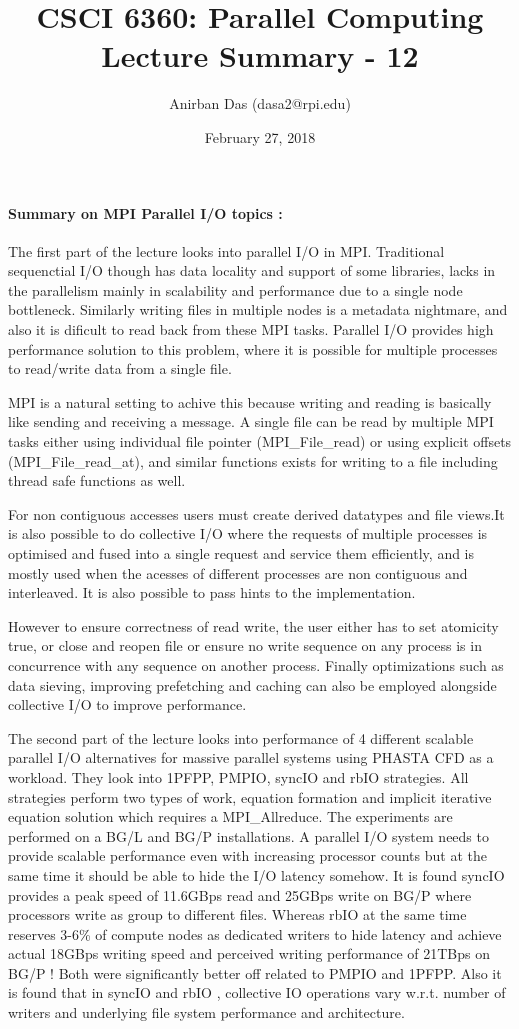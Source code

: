 \documentclass[a4paper,12 pt]{article}
\title{\vspace{-2.0cm}CSCI 6360: Parallel Computing Lecture Summary - 12}
\author{Anirban Das (dasa2@rpi.edu) }
\date{February 27, 2018}
\begin{document}
\maketitle

\paragraph{Summary on MPI Parallel I/O topics :\\}
The first part of the lecture looks into parallel I/O in MPI. Traditional sequenctial I/O though has data locality and support of some libraries, lacks in the parallelism mainly in scalability and performance due to a single node bottleneck. Similarly writing files in multiple nodes is a metadata nightmare, and also it is dificult to read back from these MPI tasks. Parallel I/O provides high performance solution to this problem, where it is possible for multiple processes to read/write data from a single file. 

MPI is a natural setting to achive this because writing and reading is basically like sending and receiving a message. A single file can be read by multiple MPI tasks either using individual file pointer (MPI\_File\_read) or using explicit offsets (MPI\_File\_read\_at), and similar functions exists for writing to a file including thread safe functions as well. 

For non contiguous accesses users must create derived datatypes and file views.It is also possible to do collective I/O where the requests of multiple processes is optimised and fused into a single request and service them efficiently, and is mostly used when the acesses of different processes are non contiguous and interleaved. It is also possible to pass hints to the implementation. 

However to ensure correctness of read write, the user either has to set atomicity true, or close and reopen file or ensure no write sequence on any process is in concurrence with any sequence on another process. Finally optimizations such as data sieving, improving prefetching and caching can also be employed alongside collective I/O to improve performance.

The second part of the lecture looks into performance of 4 different scalable parallel I/O alternatives for massive parallel systems using PHASTA CFD as a workload. They look into 1PFPP, PMPIO, syncIO and rbIO strategies. All strategies perform two types of work, equation formation and implicit iterative equation solution which requires a MPI\_Allreduce. The experiments are performed on a BG/L and BG/P installations. A parallel I/O system needs to provide scalable performance even with increasing processor counts but at the same time it should be able to hide the I/O latency somehow. It is found syncIO provides a peak speed of 11.6GBps read and 25GBps write on BG/P where processors write as group to different files. Whereas rbIO at the same time reserves 3-6\% of compute nodes as dedicated writers to hide latency and achieve actual 18GBps writing speed and perceived writing performance of 21TBps on BG/P ! Both were significantly better off related to PMPIO and 1PFPP. Also it is found that in syncIO and rbIO , collective IO operations vary w.r.t. number of writers and underlying file system performance and architecture.
	
\end{document}

